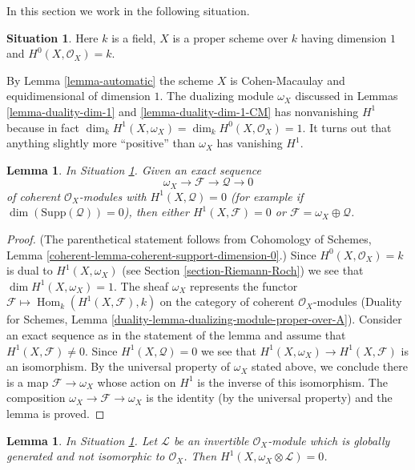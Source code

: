 \documentclass{stacks-project}
\theoremstyle{plain}
\newtheorem{lemma}[subsection]{Lemma}
\theoremstyle{definition}
\newtheorem{situation}[subsection]{Situation}
\theoremstyle{remark}
\numberwithin{equation}{subsection}
\def\Hom{\mathop{\mathrm{Hom}}\nolimits}
\begin{document}
\noindent
In this section we work in the following situation.

\begin{situation}
\label{situation-Cohen-Macaulay-curve}
Here $k$ is a field, $X$ is a proper scheme over $k$ having dimension $1$
and $H^0(X, \mathcal{O}_X) = k$.
\end{situation}

\noindent
By Lemma \ref{lemma-automatic} the scheme $X$ is Cohen-Macaulay and
equidimensional of dimension $1$. The dualizing module $\omega_X$
discussed in Lemmas \ref{lemma-duality-dim-1} and
\ref{lemma-duality-dim-1-CM} has nonvanishing $H^1$ because in fact
$\dim_k H^1(X, \omega_X) = \dim_k H^0(X, \mathcal{O}_X) = 1$. It turns out
that anything slightly more ``positive'' than $\omega_X$ has vanishing $H^1$.

\begin{lemma}
\label{lemma-vanishing}
In Situation \ref{situation-Cohen-Macaulay-curve}. Given an exact sequence
$$
\omega_X \to \mathcal{F} \to \mathcal{Q} \to 0
$$
of coherent $\mathcal{O}_X$-modules with $H^1(X, \mathcal{Q}) = 0$
(for example if $\dim(\text{Supp}(\mathcal{Q})) = 0$), then
either $H^1(X, \mathcal{F}) = 0$ or
$\mathcal{F} = \omega_X \oplus \mathcal{Q}$.
\end{lemma}

\begin{proof}
(The parenthetical statement follows from
Cohomology of Schemes, Lemma \ref{coherent-lemma-coherent-support-dimension-0}.)
Since $H^0(X, \mathcal{O}_X) = k$ is dual to $H^1(X, \omega_X)$
(see Section \ref{section-Riemann-Roch})
we see that $\dim H^1(X, \omega_X) = 1$. The sheaf $\omega_X$
represents the functor
$\mathcal{F} \mapsto \Hom_k(H^1(X, \mathcal{F}), k)$
on the category of coherent $\mathcal{O}_X$-modules
(Duality for Schemes, Lemma
\ref{duality-lemma-dualizing-module-proper-over-A}).
Consider an exact sequence as in the statement of the lemma
and assume that $H^1(X, \mathcal{F}) \not = 0$. Since
$H^1(X, \mathcal{Q}) = 0$ we see that
$H^1(X, \omega_X) \to H^1(X, \mathcal{F})$ is an isomorphism.
By the universal property of $\omega_X$ stated above, we conclude there
is a map $\mathcal{F} \to \omega_X$ whose action on $H^1$ is the inverse
of this isomorphism. The composition $\omega_X \to \mathcal{F} \to \omega_X$
is the identity (by the universal property) and the lemma is proved.
\end{proof}

\begin{lemma}
\label{lemma-vanishing-twist}
In Situation \ref{situation-Cohen-Macaulay-curve}. Let
$\mathcal{L}$ be an invertible $\mathcal{O}_X$-module which is
globally generated and not isomorphic to $\mathcal{O}_X$. Then
$H^1(X, \omega_X \otimes \mathcal{L}) = 0$.
\end{lemma}
\end{document}
